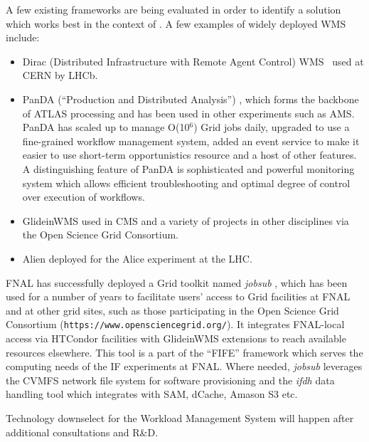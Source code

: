\noindent
A few existing frameworks are being evaluated in order to identify a solution which works best in the context of \pd.
A few examples of widely deployed WMS include:
\begin{itemize}

\item Dirac (Distributed Infrastructure with Remote Agent Control) WMS~\cite{dirac_wms} used at CERN by LHCb.

\item PanDA (``Production and Distributed Analysis'') \cite{panda_chep13}, which forms the backbone of ATLAS processing and has been used in other experiments such as AMS.
PanDA has scaled up to manage O(10$^6$) Grid jobs daily, upgraded to use a fine-grained workflow management system, added an event service to
make it easier to use short-term opportunistics resource and a host of other features. A distinguishing feature of PanDA is sophisticated and powerful
monitoring system which allows efficient troubleshooting and optimal degree of control over execution of workflows.

\item GlideinWMS \cite{glideinwms_chep13} used in CMS and a variety of projects in other disciplines via the Open Science Grid Consortium.

\item Alien \cite{alien} deployed for the Alice experiment at the LHC.

\end{itemize}

\noindent
FNAL has successfully deployed a Grid toolkit named \textit{jobsub} \cite{jobsub_chep13}, which has been used for a number of years to facilitate users' access to
Grid facilities at FNAL and at other grid sites, such as those participating in the Open Science Grid Consortium ({\tt https://www.opensciencegrid.org/}).
It integrates FNAL-local access via HTCondor facilities with GlideinWMS extensions to reach available resources elsewhere. This tool is a part of
the ``FIFE'' framework which serves the computing needs of the IF experiments at FNAL. Where needed, \textit{jobsub} leverages the CVMFS
network file system for software provisioning and the \textit{ifdh} data handling tool which integrates
with SAM, dCache, Amason S3 etc.

Technology downselect for the \pd Workload Management System will happen after additional consultations and R\&D.


